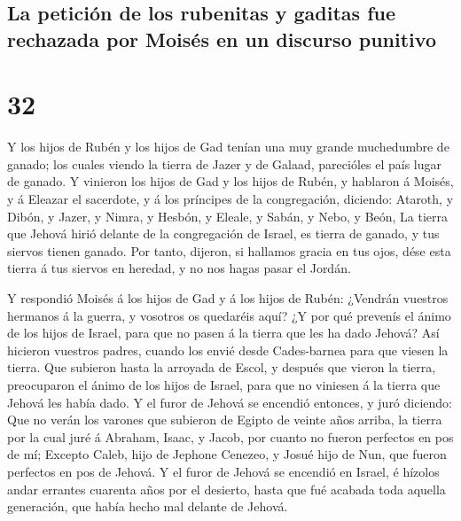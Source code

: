 \hypertarget{la-peticiuxf3n-de-los-rubenitas-y-gaditas-fue-rechazada-por-moisuxe9s-en-un-discurso-punitivo}{%
\subsection{La petición de los rubenitas y gaditas fue rechazada por
Moisés en un discurso
punitivo}\label{la-peticiuxf3n-de-los-rubenitas-y-gaditas-fue-rechazada-por-moisuxe9s-en-un-discurso-punitivo}}

\hypertarget{section-31}{%
\section{32}\label{section-31}}

 Y los hijos de Rubén y los hijos de Gad tenían una muy
grande muchedumbre de ganado; los cuales viendo la tierra de Jazer y de
Galaad, parecióles el país lugar de ganado.  Y vinieron los
hijos de Gad y los hijos de Rubén, y hablaron á Moisés, y á Eleazar el
sacerdote, y á los príncipes de la congregación, diciendo: 
Ataroth, y Dibón, y Jazer, y Nimra, y Hesbón, y Eleale, y Sabán, y Nebo,
y Beón,  La tierra que Jehová hirió delante de la
congregación de Israel, es tierra de ganado, y tus siervos tienen
ganado.  Por tanto, dijeron, si hallamos gracia en tus ojos,
dése esta tierra á tus siervos en heredad, y no nos hagas pasar el
Jordán.

 Y respondió Moisés á los hijos de Gad y á los hijos de
Rubén: ¿Vendrán vuestros hermanos á la guerra, y vosotros os quedaréis
aquí?  ¿Y por qué prevenís el ánimo de los hijos de Israel,
para que no pasen á la tierra que les ha dado Jehová?  Así
hicieron vuestros padres, cuando los envié desde Cades-barnea para que
viesen la tierra.  Que subieron hasta la arroyada de Escol,
y después que vieron la tierra, preocuparon el ánimo de los hijos de
Israel, para que no viniesen á la tierra que Jehová les había dado.
 Y el furor de Jehová se encendió entonces, y juró
diciendo:  Que no verán los varones que subieron de Egipto
de veinte años arriba, la tierra por la cual juré á Abraham, Isaac, y
Jacob, por cuanto no fueron perfectos en pos de mí; 
Excepto Caleb, hijo de Jephone Cenezeo, y Josué hijo de Nun, que fueron
perfectos en pos de Jehová.  Y el furor de Jehová se
encendió en Israel, é hízolos andar errantes cuarenta años por el
desierto, hasta que fué acabada toda aquella generación, que había hecho
mal delante de Jehová.

